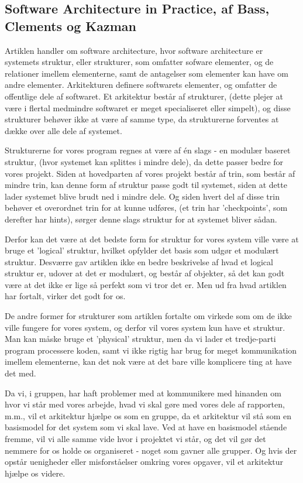 \documentclass[10pt,a4paper,danish]{article}
\begin{document}
\subsection{Software Architecture in Practice, af Bass, Clements og Kazman}
Artiklen handler om software architecture, hvor software architecture er systemets struktur, eller strukturer, som omfatter sofware elementer, og de relationer imellem elementerne, samt de antagelser som elementer kan have om andre elementer. Arkitekturen definere softwarets elementer, og omfatter de offentlige dele af softwaret. Et arkitektur består af strukturer, (dette plejer at være i flertal medmindre softwaret er meget specialiseret eller simpelt), og disse strukturer behøver ikke at være af samme type, da strukturerne forventes at dække over alle dele af systemet.

Strukturerne for vores program regnes at være af én slags - en modulær baseret struktur, (hvor systemet kan splittes i mindre dele), da dette passer bedre for vores projekt. Siden at hovedparten af vores projekt består af trin, som består af mindre trin, kan denne form af struktur passe godt til systemet, siden at dette lader systemet blive brudt ned i mindre dele. Og siden hvert del af disse trin behøver et overordnet trin for at kunne udføres, (et trin har 'checkpoints', som derefter har hints), sørger denne slags struktur for at systemet bliver sådan.

Derfor kan det være at det bedste form for struktur for vores system ville være at bruge et 'logical' struktur, hvilket opfylder det basis som udgør et modulært struktur. Desværre gav artiklen ikke en bedre beskrivelse af hvad et logical struktur er, udover at det er modulært, og består af objekter, så det kan godt være at det ikke er lige så perfekt som vi tror det er. Men ud fra hvad artiklen har fortalt, virker det godt for os.

De andre former for strukturer som artiklen fortalte om virkede som om de ikke ville fungere for vores system, og derfor vil vores system kun have et struktur. Man kan måske bruge et 'physical' struktur, men da vi lader et tredje-parti program processere koden, samt vi ikke rigtig har brug for meget kommunikation imellem elementerne, kan det nok være at det bare ville komplicere ting at have det med.

Da vi, i gruppen, har haft problemer med at kommunikere med hinanden om hvor vi står med vores arbejde, hvad vi skal gøre med vores dele af rapporten, m.m., vil et arkitektur hjælpe os som en gruppe, da et arkitektur vil stå som en basismodel for det system som vi skal lave. Ved at have en basismodel stående fremme, vil vi alle samme vide hvor i projektet vi står, og det vil gør det nemmere for os holde os organiseret - noget som gavner alle grupper. Og hvis der opstår uenigheder eller misforståelser omkring vores opgaver, vil et arkitektur hjælpe os videre.
\end{document}

